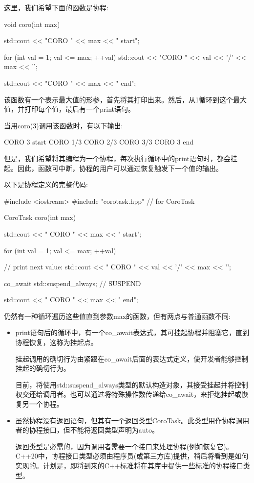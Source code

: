 这里，我们希望下面的函数是协程:

\begin{cpp}
void coro(int max)
{
	std::cout << "CORO " << max << " start\n";

	for (int val = 1; val <= max; ++val) {
		std::cout << "CORO " << val << '/' << max << '\n';
	}

	std::cout << "CORO " << max << " end\n";
}
\end{cpp}

该函数有一个表示最大值的形参，首先将其打印出来。然后，从1循环到这个最大值，并打印每个值，最后有一个print语句。

当用coro(3)调用该函数时，有以下输出:

\begin{shell}
CORO 3 start
CORO 1/3
CORO 2/3
CORO 3/3
CORO 3 end
\end{shell}

但是，我们希望将其编程为一个协程，每次执行循环中的print语句时，都会挂起。因此，函数可中断，协程的用户可以通过恢复触发下一个值的输出。


以下是协程定义的完整代码:


\begin{cpp}
#include <iostream>
#include "corotask.hpp" // for CoroTask

CoroTask coro(int max)
{
	std::cout << "             CORO " << max << " start\n";

	for (int val = 1; val <= max; ++val) {
		// print next value:
		std::cout << "          CORO " << val << '/' << max << '\n';

		co_await std::suspend_always{}; // SUSPEND
	}

	std::cout << " CORO " << max << " end\n";
}
\end{cpp}

仍然有一种循环遍历这些值直到参数max的函数，但有两点与普通函数不同:

\begin{itemize}
\item
print语句后的循环中，有一个co\_await表达式，其可挂起协程并阻塞它，直到协程恢复，这称为挂起点。

挂起调用的确切行为由紧跟在co\_await后面的表达式定义，使开发者能够控制挂起的确切行为。

目前，将使用std::suspend\_always类型的默认构造对象，其接受挂起并将控制权交还给调用者。也可以通过将特殊操作数传递给co\_await，来拒绝挂起或恢复另一个协程。

\item
虽然协程没有返回语句，但其有一个返回类型CoroTask。此类型用作协程调用者的协程接口，但不能将返回类型声明为auto。

返回类型是必需的，因为调用者需要一个接口来处理协程(例如恢复它)。C++20中，协程接口类型必须由程序员(或第三方库)提供，稍后将看到是如何实现的。计划是，即将到来的C++标准将在其库中提供一些标准的协程接口类型。
\end{itemize}

